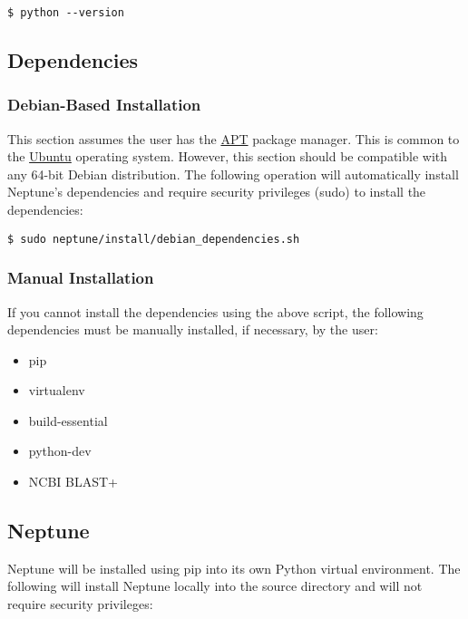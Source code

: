 \documentclass[a4paper,10pt]{article}
\begin{document}
\begin{lstlisting}
$ python --version
\end{lstlisting}

\subsection{Dependencies}

\subsubsection{Debian-Based Installation}

This section assumes the user has the \href{https://help.ubuntu.com/community/AptGet/Howto}{APT} package manager. This is common to the \href{https://en.wikipedia.org/wiki/Ubuntu_(operating_system)}{Ubuntu} operating system. However, this section should be compatible with any 64-bit Debian distribution. The following operation will automatically install Neptune's dependencies and require security privileges (sudo) to install the dependencies:

\begin{lstlisting}
$ sudo neptune/install/debian_dependencies.sh
\end{lstlisting}

\subsubsection{Manual Installation}

If you cannot install the dependencies using the above script, the following dependencies must be manually installed, if necessary, by the user:

\begin{itemize}
  \small
  \item pip
  \item virtualenv
  \item build-essential
  \item python-dev
  \item NCBI BLAST+
\end{itemize}

\subsection{Neptune}

Neptune will be installed using pip into its own Python virtual environment. The following will install Neptune locally into the source directory and will not require security privileges:
\end{document}
